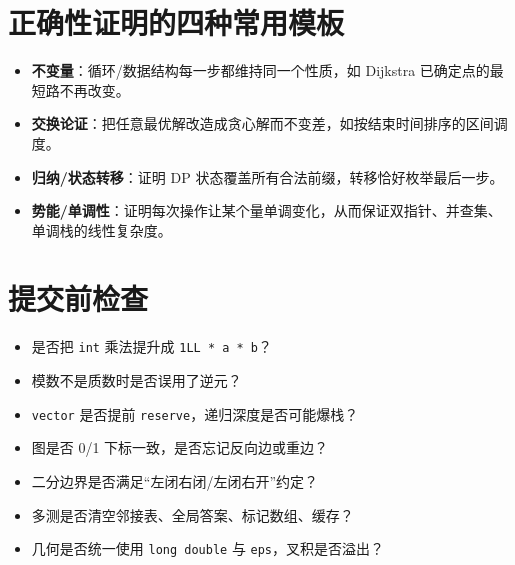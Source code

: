 \section{正确性证明的四种常用模板}\label{ux6b63ux786eux6027ux8bc1ux660eux7684ux56dbux79cdux5e38ux7528ux6a21ux677f}

\begin{itemize}
\tightlist
\item
  \textbf{不变量}：循环/数据结构每一步都维持同一个性质，如 Dijkstra 已确定点的最短路不再改变。
\item
  \textbf{交换论证}：把任意最优解改造成贪心解而不变差，如按结束时间排序的区间调度。
\item
  \textbf{归纳/状态转移}：证明 DP 状态覆盖所有合法前缀，转移恰好枚举最后一步。
\item
  \textbf{势能/单调性}：证明每次操作让某个量单调变化，从而保证双指针、并查集、单调栈的线性复杂度。
\end{itemize}

\section{提交前检查}\label{ux63d0ux4ea4ux524dux68c0ux67e5}

\begin{itemize}
\tightlist
\item
  是否把 \passthrough{\lstinline!int!} 乘法提升成 \passthrough{\lstinline!1LL * a * b!}？
\item
  模数不是质数时是否误用了逆元？
\item
  \passthrough{\lstinline!vector!} 是否提前 \passthrough{\lstinline!reserve!}，递归深度是否可能爆栈？
\item
  图是否 0/1 下标一致，是否忘记反向边或重边？
\item
  二分边界是否满足``左闭右闭/左闭右开''约定？
\item
  多测是否清空邻接表、全局答案、标记数组、缓存？
\item
  几何是否统一使用 \passthrough{\lstinline!long double!} 与 \passthrough{\lstinline!eps!}，叉积是否溢出？
\end{itemize}


